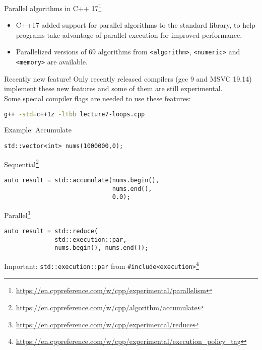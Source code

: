 \documentclass[12pt,t]{beamer}
\begin{document}
\begin{frame}[fragile]{Parallel algorithms in C++ 17\footnote{\tiny\url{https://en.cppreference.com/w/cpp/experimental/parallelism}}}
\begin{itemize}
\item C++17 added support for parallel algorithms to the standard library, to help programs take advantage of parallel execution for improved performance.
\item Parallelized versions of 69 algorithms from \lstinline|<algorithm>|, \lstinline|<numeric>| and \lstinline|<memory>| are available. 
\end{itemize}

\begin{block}{Recently new feature!}
Only recently released compilers (gcc 9 and MSVC 19.14) implement these new features and some of them are still experimental.\\
\vspace{0.5cm}
Some special compiler flags are needed to use these features:

\begin{lstlisting}[language=bash]
g++ -std=c++1z -ltbb lecture7-loops.cpp 
\end{lstlisting}
\end{block}
\end{frame}

\begin{frame}[fragile]{Example: Accumulate}

\begin{lstlisting}
std::vector<int> nums(1000000,0);
\end{lstlisting}

\begin{block}{Sequential\footnote{\tiny\url{https://en.cppreference.com/w/cpp/algorithm/accumulate}}}
\begin{lstlisting}
auto result = std::accumulate(nums.begin(), 
                              nums.end(),
                              0.0);
\end{lstlisting}
\end{block}

\begin{block}{Parallel\footnote{\tiny\url{https://en.cppreference.com/w/cpp/experimental/reduce}}}
\begin{lstlisting}
auto result = std::reduce(
              std::execution::par,
              nums.begin(), nums.end());
\end{lstlisting}
\end{block}

Important: \lstinline|std::execution::par| from \lstinline|#include<execution>|\footnote{\tiny\url{https://en.cppreference.com/w/cpp/experimental/execution_policy_tag}}
\end{frame}
\end{document}
